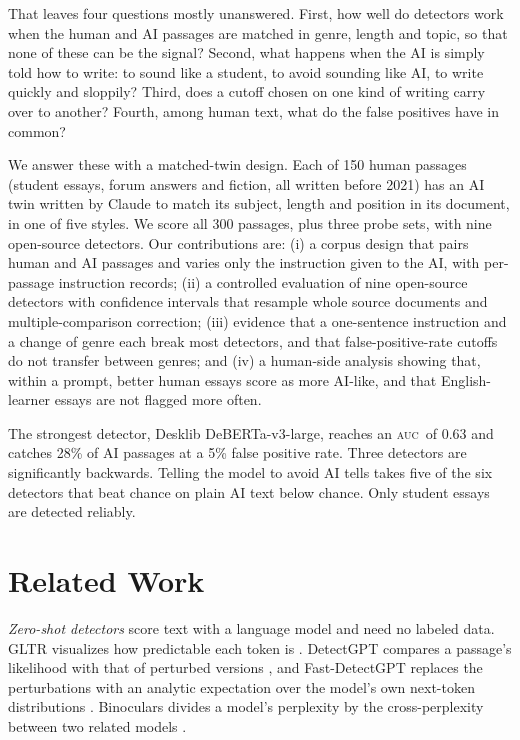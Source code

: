 \documentclass[conference]{IEEEtran}
\newcommand{\auc}{\textsc{auc}}
\begin{document}
That leaves four questions mostly unanswered. First, how well do detectors work when the human and AI passages are matched in genre, length and topic, so that none of these can be the signal? Second, what happens when the AI is simply told how to write: to sound like a student, to avoid sounding like AI, to write quickly and sloppily? Third, does a cutoff chosen on one kind of writing carry over to another? Fourth, among human text, what do the false positives have in common?

We answer these with a matched-twin design. Each of 150 human passages (student essays, forum answers and fiction, all written before 2021) has an AI twin written by Claude to match its subject, length and position in its document, in one of five styles. We score all 300 passages, plus three probe sets, with nine open-source detectors. Our contributions are:
(i) a corpus design that pairs human and AI passages and varies only the instruction given to the AI, with per-passage instruction records;
(ii) a controlled evaluation of nine open-source detectors with confidence intervals that resample whole source documents and multiple-comparison correction;
(iii) evidence that a one-sentence instruction and a change of genre each break most detectors, and that false-positive-rate cutoffs do not transfer between genres; and
(iv) a human-side analysis showing that, within a prompt, better human essays score as more AI-like, and that English-learner essays are not flagged more often.

The strongest detector, Desklib DeBERTa-v3-large, reaches an \auc\ of 0.63 and catches 28\% of AI passages at a 5\% false positive rate. Three detectors are significantly backwards. Telling the model to avoid AI tells takes five of the six detectors that beat chance on plain AI text below chance. Only student essays are detected reliably.

\section{Related Work}
\textit{Zero-shot detectors} score text with a language model and need no labeled data. GLTR visualizes how predictable each token is \cite{gltr}. DetectGPT compares a passage's likelihood with that of perturbed versions \cite{detectgpt}, and Fast-DetectGPT replaces the perturbations with an analytic expectation over the model's own next-token distributions \cite{fastdetectgpt}. Binoculars divides a model's perplexity by the cross-perplexity between two related models \cite{binoculars}.
\end{document}
